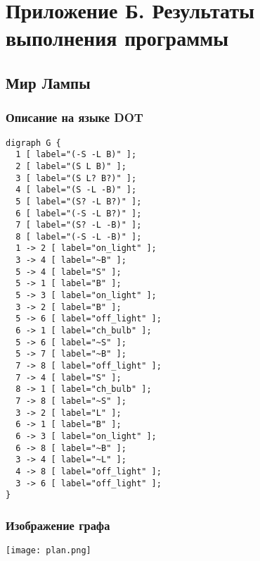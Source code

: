 \chapter*{Приложение Б. Результаты выполнения программы}
\label{sec:appendix_problems}
\section*{Мир Лампы}

\subsection*{Описание на языке DOT}

\begin{verbatim}
digraph G {
  1 [ label="(-S -L B)" ];
  2 [ label="(S L B)" ];
  3 [ label="(S L? B?)" ];
  4 [ label="(S -L -B)" ];
  5 [ label="(S? -L B?)" ];
  6 [ label="(-S -L B?)" ];
  7 [ label="(S? -L -B)" ];
  8 [ label="(-S -L -B)" ];
  1 -> 2 [ label="on_light" ];
  3 -> 4 [ label="~B" ];
  5 -> 4 [ label="S" ];
  5 -> 1 [ label="B" ];
  5 -> 3 [ label="on_light" ];
  3 -> 2 [ label="B" ];
  5 -> 6 [ label="off_light" ];
  6 -> 1 [ label="ch_bulb" ];
  5 -> 6 [ label="~S" ];
  5 -> 7 [ label="~B" ];
  7 -> 8 [ label="off_light" ];
  7 -> 4 [ label="S" ];
  8 -> 1 [ label="ch_bulb" ];
  7 -> 8 [ label="~S" ];
  3 -> 2 [ label="L" ];
  6 -> 1 [ label="B" ];
  6 -> 3 [ label="on_light" ];
  6 -> 8 [ label="~B" ];
  3 -> 4 [ label="~L" ];
  4 -> 8 [ label="off_light" ];
  3 -> 6 [ label="off_light" ];
}
\end{verbatim}

\subsection*{Изображение графа}

\texttt{[image: plan.png]}

\begin{comment}
\section*{Мир Сигнализации}

\subsection*{Описание на языке DOT}

\subsection*{Изображение графа}
\end{comment}